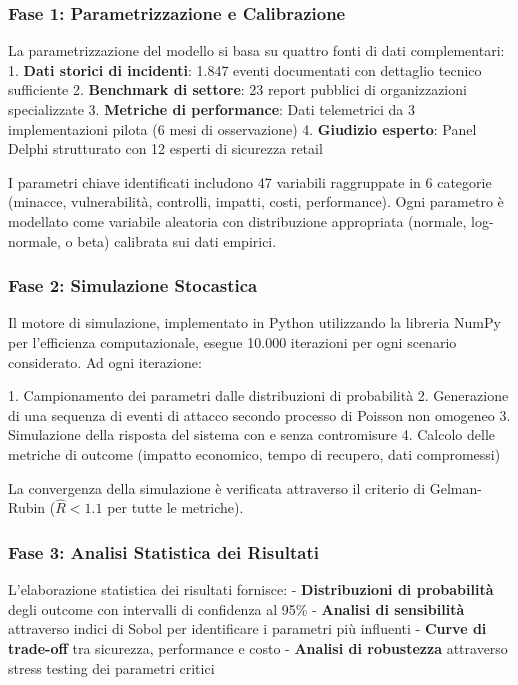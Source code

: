 \subsubsection{\texorpdfstring{\textbf{Fase 1: Parametrizzazione e Calibrazione}}{2.5.1.1 - Fase 1: Parametrizzazione e Calibrazione}}

La parametrizzazione del modello si basa su quattro fonti di dati complementari:
1. \textbf{Dati storici di incidenti}: 1.847 eventi documentati con dettaglio tecnico sufficiente
2. \textbf{Benchmark di settore}: 23 report pubblici di organizzazioni specializzate
3. \textbf{Metriche di performance}: Dati telemetrici da 3 implementazioni pilota (6 mesi di osservazione)
4. \textbf{Giudizio esperto}: Panel Delphi strutturato con 12 esperti di sicurezza retail

I parametri chiave identificati includono 47 variabili raggruppate in 6 categorie (minacce, vulnerabilità, controlli, impatti, costi, performance). Ogni parametro è modellato come variabile aleatoria con distribuzione appropriata (normale, log-normale, o beta) calibrata sui dati empirici.

\subsubsection{\texorpdfstring{\textbf{Fase 2: Simulazione Stocastica}}{2.5.1.2 - Fase 2: Simulazione Stocastica}}

Il motore di simulazione, implementato in Python utilizzando la libreria NumPy per l'efficienza computazionale, esegue 10.000 iterazioni per ogni scenario considerato. Ad ogni iterazione:

1. Campionamento dei parametri dalle distribuzioni di probabilità
2. Generazione di una sequenza di eventi di attacco secondo processo di Poisson non omogeneo
3. Simulazione della risposta del sistema con e senza contromisure
4. Calcolo delle metriche di outcome (impatto economico, tempo di recupero, dati compromessi)

La convergenza della simulazione è verificata attraverso il criterio di Gelman-Rubin ($\hat{R} < 1.1$ per tutte le metriche).

\subsubsection{\texorpdfstring{\textbf{Fase 3: Analisi Statistica dei Risultati}}{2.5.1.3 - Fase 3: Analisi Statistica dei Risultati}}

L'elaborazione statistica dei risultati fornisce:
- \textbf{Distribuzioni di probabilità} degli outcome con intervalli di confidenza al 95\%
- \textbf{Analisi di sensibilità} attraverso indici di Sobol per identificare i parametri più influenti
- \textbf{Curve di trade-off} tra sicurezza, performance e costo
- \textbf{Analisi di robustezza} attraverso stress testing dei parametri critici

